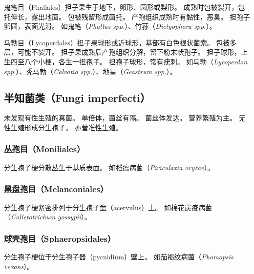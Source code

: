\documentclass[11pt]{article}
\begin{document}
\par

鬼笔目（Phallales）担子果生于地下，卵形、圆形或梨形。
成熟时包被裂开，包托伸长，露出地面。
包被残留形成菌托。
产孢组织成熟时有黏性，恶臭。
担孢子卵圆，表面光滑。
如鬼笔（\textit{Phallus spp.}）、竹荪（\textit{Dictyophora spp.}）。

\par

马勃目（Lycoperdales）担子果球形或近球形，基部有白色根状菌索。
包被多层，可能不裂开。
担子果成熟后产孢组织分解，留下粉末状孢子。
担子球形，上生四至八个小梗，各生一担孢子。
担孢子球形，常有疣刺。
如马勃（\textit{Lycoperdon spp.}）、秃马勃（\textit{Calvatia spp.}）、地星（\textit{Geastrum spp.}）。

\subsection{半知菌类（Fungi imperfecti）}
未发现有性生殖的真菌。
单倍体，菌丝有隔。
菌丝体发达。
营养繁殖为主。
无性生殖形成分生孢子。
亦营准性生殖。

\subsubsection{丛孢目（Moniliales）}
分生孢子梗分散丛生于基质表面。
如稻瘟病菌（\textit{Piriculaxia oryzae}）。

\subsubsection{黑盘孢目（Melanconiales）}
分生孢子梗紧密排列于分生孢子盘（acervulus）上。
如棉花炭疫病菌（\textit{Colletotrichum gossypii}）。

\subsubsection{球壳孢目（Sphaeropsidales）}
分生孢子梗位于分生孢子器（pycnidium）壁上。
如茄褐纹病菌（\textit{Phomopsis vexans}）。
\end{document}

